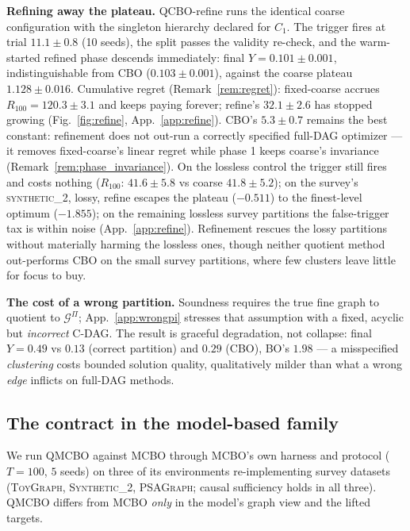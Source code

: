 \documentclass[twoside]{article}
\newcommand{\QCBO}{\textsc{QCBO}}
\newcommand{\QMCBO}{\textsc{QMCBO}}
\newcommand{\CBO}{\textsc{CBO}}
\newcommand{\BO}{\textsc{BO}}
\newcommand{\Gq}{\mathcal{G}^{\Pi}}
\begin{document}
\textbf{Refining away the plateau.}
\QCBO{}-refine runs the identical coarse configuration with the singleton hierarchy declared for $C_1$. The trigger fires at trial $11.1\pm0.8$ (10 seeds), the split passes the validity re-check, and the warm-started refined phase descends immediately: final $Y=0.101\pm0.001$, indistinguishable from \CBO{} ($0.103\pm0.001$), against the coarse plateau $1.128\pm0.016$. Cumulative regret (Remark~\ref{rem:regret}): fixed-coarse accrues $R_{100}=120.3\pm3.1$ and keeps paying forever; refine's $32.1\pm2.6$ has stopped growing (Fig.~\ref{fig:refine}, App.~\ref{app:refine}). \CBO{}'s $5.3\pm0.7$ remains the best constant: refinement does not out-run a correctly specified full-DAG optimizer --- it removes fixed-coarse's linear regret while phase 1 keeps coarse's invariance (Remark~\ref{rem:phase_invariance}). On the lossless control the trigger still fires and costs nothing ($R_{100}$: $41.6\pm5.8$ vs coarse $41.8\pm5.2$); on the survey's \textsc{synthetic\_2}, lossy, refine escapes the plateau ($-0.511$) to the finest-level optimum ($-1.855$); on the remaining lossless survey partitions the false-trigger tax is within noise (App.~\ref{app:refine}). Refinement rescues the lossy partitions without materially harming the lossless ones, though neither quotient method out-performs \CBO{} on the small survey partitions, where few clusters leave little for focus to buy.

\textbf{The cost of a wrong partition.} Soundness requires the true fine graph to quotient to $\Gq$; App.~\ref{app:wrongpi} stresses that assumption with a fixed, acyclic but \emph{incorrect} C-DAG. The result is graceful degradation, not collapse: final $Y=0.49$ vs $0.13$ (correct partition) and $0.29$ (\CBO{}), \BO{}'s $1.98$ --- a misspecified \emph{clustering} costs bounded solution quality, qualitatively milder than what a wrong \emph{edge} inflicts on full-DAG methods.

\begin{table}[t]\centering
  \caption{Realized price of coarsening on \textsc{ClusterBench10L} (lossy; 10 seeds, $T{=}100$, $y^\star{=}0.10$). The optimum splits $C_1$: \QCBO{}-coarse plateaus above $y^\star$ by the price of Prop.~\ref{prop:price}; \QCBO{}-refine splits $C_1$ at the trigger and recovers $y^\star$, its $R_T$ a bounded transient.}
  \label{tab:price}
  \small
\end{table}

\subsection{The contract in the model-based family}
\label{sec:exp-qmcbo}
We run \QMCBO{} against MCBO through MCBO's own harness and protocol ($T{=}100$, $5$ seeds) on three of its environments re-implementing survey datasets (\textsc{ToyGraph}, \textsc{Synthetic\_2}, \textsc{PSAGraph}; causal sufficiency holds in all three). \QMCBO{} differs from MCBO \emph{only} in the model's graph view and the lifted targets.
\end{document}
